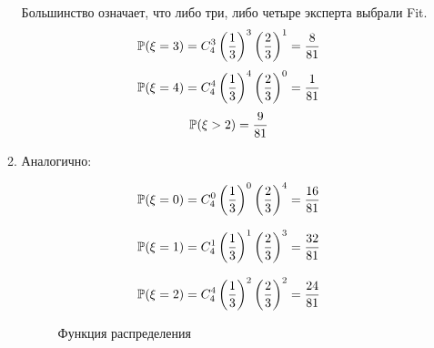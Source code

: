 \begin{enumerate}
\begin{enumerate}
Большинство означает, что либо три, либо четыре эксперта выбрали Fit.
\[
\P(\xi = 3) = C_4^3\left(\frac{1}{3}\right)^3 \left(\frac{2}{3}\right)^{1} = \frac{8}{81}
\]
\[
\P(\xi = 4) = C_4^4\left(\frac{1}{3}\right)^4 \left(\frac{2}{3}\right)^{0} = \frac{1}{81}
\]
\[
\P( \xi > 2) =  \frac{9}{81}
\]
\item Аналогично:

\[ \P(\xi = 0) = C_4^0\left(\frac{1}{3}\right)^0 \left(\frac{2}{3}\right)^{4} = \frac{16}{81}\]

\[ \P(\xi = 1) = C_4^1\left(\frac{1}{3}\right)^1 \left(\frac{2}{3}\right)^{3} = \frac{32}{81}\]

\[ \P(\xi = 2) = C_4^4\left(\frac{1}{3}\right)^2 \left(\frac{2}{3}\right)^{2} = \frac{24}{81}\]

\begin{figure}[h!]
    \noindent{}
    \caption{Функция распределения}
    \label{cdf_kr2017}
\end{figure}


\end{enumerate}
\end{enumerate}
